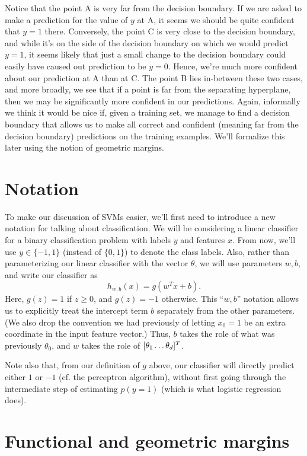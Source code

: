 \documentclass{article}
\begin{document}
Notice that the point A is very far from the decision boundary.  If we are asked to make a prediction
for the value of $y$ at A, it seems we should be quite confident that $y=1$ there.
Conversely, the point C is very close to the decision boundary, and while it's on the
side of the decision boundary on which we would predict $y=1$, it seems likely that just
a small change to the decision boundary could easily have caused out prediction to be $y=0$.
Hence, we're much more confident about our prediction at A than at C.  The point B lies
in-between these two cases, and more broadly, we see that if a point is far from the
separating hyperplane, then we may be significantly more confident in our predictions.
Again, informally we think it would be nice if, given a training set, we manage to find a
decision boundary that allows us to make all correct and confident (meaning far from the
decision boundary) predictions on the training examples.  We'll formalize this later using
the notion of geometric margins.


\section{Notation}

To make our discussion of SVMs easier, we'll first need to introduce a new notation
for talking about classification.
We will be considering a linear classifier for a binary
classification problem with labels $y$ and features $x$.  From now, we'll
use $y \in \{-1,1\}$ (instead of $\{0,1\}$) to denote the class labels.  Also, rather
than parameterizing our linear
classifier with the vector $\theta$, we will use parameters $w,b$, and write our
classifier as
\[
h_{w,b}(x) = g(w^Tx + b).
\]
Here, $g(z) = 1$ if $z \geq 0$, and $g(z) = -1$ otherwise.
This ``$w,b$'' notation allows us to explicitly treat the intercept term $b$ separately
from the other parameters.  (We also drop the convention we had previously of letting $x_0=1$ be
an extra coordinate in the input feature vector.)  Thus, $b$ takes the role of what was previously
$\theta_0$, and $w$ takes the role of $[\theta_1 \ldots \theta_{{d}}]^T$.

Note also that, from our definition of $g$ above, our classifier will directly
predict either $1$ or $-1$ (cf. the perceptron algorithm), without first going through
the intermediate step of estimating $p(y=1)$ (which
is what logistic regression does).

\section{Functional and geometric margins}
	\label{margins}
\end{document}
